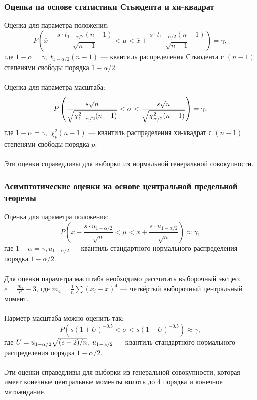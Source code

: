 \documentclass[12pt]{article}
\begin{document}
\begin{flushleft}
		\subsubsection{Оценка на основе статистики Стьюдента и хи-квадрат}
			Оценка для параметра положения\cite{theory}:
			\begin{equation}
				P\left(\overline{x}-\frac{s\cdot t_{1-\alpha/2}(n-1)}{\sqrt{n-1}} < \mu < \overline{x}+\frac{s\cdot t_{1-\alpha/2}(n-1)}{\sqrt{n-1}}\right) = \gamma,
				\label{mStud}
			\end{equation}
			где $1 - \alpha = \gamma, \; t_{1-\alpha/2}(n-1)$ --- квантиль распределения Стьюдента с $(n-1)$ степенями свободы порядка $1 - \alpha/2$.\\
			\phantom{0}\\
			Оценка для параметра масштаба:
			\begin{equation}
				P\left(\frac{s\sqrt{n}}{\sqrt{\mathstrut \chi^2_{1 - \alpha/2}(n-1)}} < \sigma < \frac{s\sqrt{n}}{\sqrt{\mathstrut \chi^2_{\alpha/2}(n-1)}}\right) = \gamma,
				\label{sStud}
			\end{equation}
			где $1 - \alpha = \gamma, \; \chi^2_{p}(n-1)$ --- квантиль распределения хи-квадрат с $(n-1)$ степенями свободы порядка $p$.\\
			\phantom{0}\\
			Эти оценки справедливы для выборки из нормальной генеральной совокупности.

		\subsubsection{Асимптотические оценки на основе центральной предельной теоремы}
			Оценка для параметра положения\cite{theory}:
			\begin{equation}
				P\left(\overline{x}-\frac{s\cdot u_{1-\alpha/2}}{\sqrt{n}} < \mu < \overline{x}+\frac{s\cdot u_{1-\alpha/2}}{\sqrt{n}}\right) \approx \gamma,
				\label{mAsympt}
			\end{equation}
			где $1-\alpha = \gamma, u_{1-\alpha/2}$ --- квантиль стандартного нормального распределения порядка $1 - \alpha/2$.\\
			\phantom{0}\\
			Для оценки параметра масштаба необходимо рассчитать выборочный эксцесс $e = \frac{m_4}{s^4}-3$, где $m_4 = \frac{1}{n}\sum(x_i - \overline{x})^4$ --- четвёртый выборочный центральный момент.\\
			\phantom{0}\\
			Парметр масштаба можно оценить так:
			\begin{equation}
				P\left(s(1 + U)^{-0.5} < \sigma < s(1 - U)^{-0.5}\right) \approx \gamma,
				\label{sAsympt}
			\end{equation} 
			где $U = u_{1-\alpha/2}\sqrt{\mathstrut (e+2)/n}, \; u_{1-\alpha/2}$ --- квантиль стандартного нормального распределения порядка $1 - \alpha/2$.\\
			\phantom{0}\\
			Эти оценки справедливы для выборки из генеральной совокупности, которая имеет конечные центральные моменты вплоть до 4 порядка и конечное матожидание.
\newpage


\end{flushleft}
\end{document}
